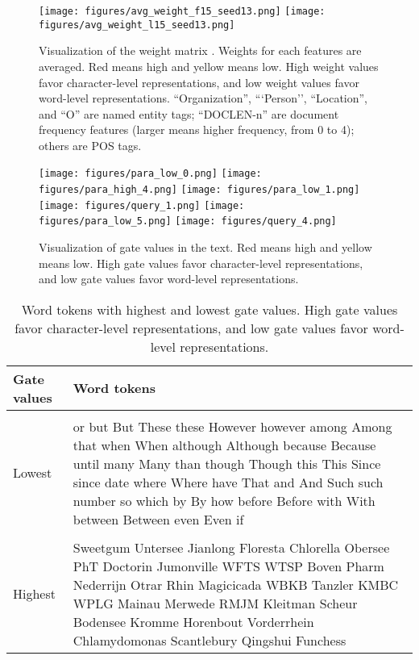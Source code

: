 \documentclass{article} \usepackage{iclr2017_conference,times}
\begin{document}
\begin{figure}[t]
\begin{center}
\texttt{[image: figures/avg\_weight\_f15\_seed13.png]} \vskip -0.05in
\texttt{[image: figures/avg\_weight\_l15\_seed13.png]}
\caption{\small Visualization of the weight matrix . Weights for each features are averaged. Red means high and yellow means low. High weight values favor character-level representations, and low weight values favor word-level representations. ``Organization'', ```Person'', ``Location'', and ``O'' are named entity tags; ``DOCLEN-n'' are document frequency features (larger  means higher frequency,  from 0 to 4); others are POS tags.}
\label{fig:avg_w}
\end{center}
\vspace{-0.2in}
\end{figure}


\begin{figure}[t]
\vspace{-0.1in}
\begin{center}
\texttt{[image: figures/para\_low\_0.png]}
\texttt{[image: figures/para\_high\_4.png]} \vskip -0.07in
\texttt{[image: figures/para\_low\_1.png]}
\texttt{[image: figures/query\_1.png]} \vskip -0.07in
\texttt{[image: figures/para\_low\_5.png]}
\texttt{[image: figures/query\_4.png]}
\caption{\small Visualization of gate values in the text. Red means high and yellow means low. High gate values favor character-level representations, and low gate values favor word-level representations.}
\label{fig:para}
\end{center}
\end{figure}

\begin{table}[t]
\caption{\small Word tokens with highest and lowest gate values. High gate values favor character-level representations, and low gate values favor word-level representations.}
\label{tab:top}
\begin{center}
\begin{tabular}{lp{11.5cm}}
Gate values & Word tokens
\\ \hline \\
Lowest & or but But These these However however among Among that when When although Although because Because until many Many than though Though this This Since since date where Where have That and And Such such number so which by By how before Before with With between Between even Even if \\ \hline \\
Highest & Sweetgum Untersee Jianlong Floresta Chlorella Obersee PhT Doctorin Jumonville WFTS WTSP Boven Pharm Nederrijn Otrar Rhin Magicicada WBKB Tanzler KMBC WPLG Mainau Merwede RMJM Kleitman Scheur Bodensee Kromme Horenbout Vorderrhein Chlamydomonas Scantlebury Qingshui Funchess 
\end{tabular}
\end{center}
\end{table}
\end{document}
